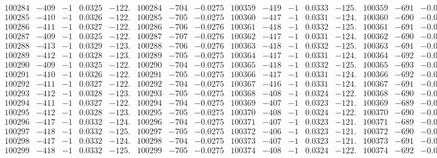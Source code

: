 \documentclass[11pt,reqno,a4letter]{article}
\numberwithin{figure}{section}
\numberwithin{table}{section}
\theoremstyle{plain}
\numberwithin{theorem}{section}
\theoremstyle{definition}
\begin{document}
\begin{table}[ht!]
\begin{equation*}
{\begin{array}{ccccc|ccc||ccccc|ccc}
100284 & -409 & -1 & 0.0325 & -122. & 100284 & -704 & -0.0275 & 100359 & -419 & -1 & 0.0333 & -125. & 100359 & -691 & -0.0270  \\
100285 & -410 & -1 & 0.0326 & -122. & 100285 & -705 & -0.0275 & 100360 & -417 & -1 & 0.0331 & -124. & 100360 & -690 & -0.0269  \\
100286 & -411 & -1 & 0.0327 & -122. & 100286 & -706 & -0.0276 & 100361 & -418 & -1 & 0.0332 & -125. & 100361 & -691 & -0.0270  \\
100287 & -409 & -1 & 0.0325 & -122. & 100287 & -707 & -0.0276 & 100362 & -417 & -1 & 0.0331 & -124. & 100362 & -690 & -0.0269  \\
100288 & -413 & -1 & 0.0329 & -123. & 100288 & -706 & -0.0276 & 100363 & -418 & -1 & 0.0332 & -125. & 100363 & -691 & -0.0270  \\
100289 & -412 & -1 & 0.0328 & -123. & 100289 & -705 & -0.0275 & 100364 & -417 & -1 & 0.0331 & -124. & 100364 & -692 & -0.0270  \\
100290 & -409 & -1 & 0.0325 & -122. & 100290 & -704 & -0.0275 & 100365 & -418 & -1 & 0.0332 & -125. & 100365 & -693 & -0.0270  \\
100291 & -410 & -1 & 0.0326 & -122. & 100291 & -705 & -0.0275 & 100366 & -417 & -1 & 0.0331 & -124. & 100366 & -692 & -0.0270  \\
100292 & -411 & -1 & 0.0327 & -122. & 100292 & -704 & -0.0275 & 100367 & -416 & -1 & 0.0331 & -124. & 100367 & -691 & -0.0270  \\
100293 & -412 & -1 & 0.0328 & -123. & 100293 & -705 & -0.0275 & 100368 & -408 & -1 & 0.0324 & -122. & 100368 & -690 & -0.0269  \\
100294 & -411 & -1 & 0.0327 & -122. & 100294 & -704 & -0.0275 & 100369 & -407 & -1 & 0.0323 & -121. & 100369 & -689 & -0.0269  \\
100295 & -412 & -1 & 0.0328 & -123. & 100295 & -705 & -0.0275 & 100370 & -408 & -1 & 0.0324 & -122. & 100370 & -690 & -0.0269  \\
100296 & -417 & -1 & 0.0332 & -124. & 100296 & -704 & -0.0275 & 100371 & -407 & -1 & 0.0323 & -121. & 100371 & -689 & -0.0269  \\
100297 & -418 & -1 & 0.0332 & -125. & 100297 & -705 & -0.0275 & 100372 & -406 & -1 & 0.0323 & -121. & 100372 & -690 & -0.0269  \\
100298 & -417 & -1 & 0.0332 & -124. & 100298 & -704 & -0.0275 & 100373 & -407 & -1 & 0.0323 & -121. & 100373 & -691 & -0.0270  \\
100299 & -418 & -1 & 0.0332 & -125. & 100299 & -705 & -0.0275 & 100374 & -408 & -1 & 0.0324 & -122. & 100374 & -692 & -0.0270  \\

\end{array}}
\end{equation*}
\end{table}
\end{document}

